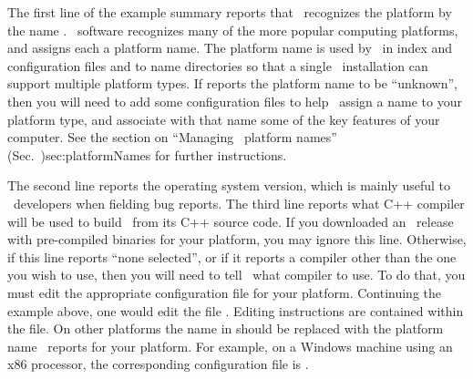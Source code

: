 The first line of the example summary reports that \OOMMF\ recognizes
the platform by the name .  \OOMMF\ software recognizes many
of the more popular computing platforms, and assigns each a platform
name.  The platform name is used by \OOMMF\ in index and configuration
files and to name directories so that a single \OOMMF\ installation can
support multiple platform types.  If  reports
the platform name to be ``unknown'', then you will need to add some
configuration files to help \OOMMF\ assign a name to your platform type,
and associate with that name some of the key features of your computer.
See the section on
{``Managing \OOMMF\ platform names'' (Sec.~}{)}{sec:platformNames}
for further instructions.

The second line reports the operating system version, which is mainly
useful to \OOMMF\ developers when fielding bug reports.
The third line reports what C++ compiler will be used to build
\OOMMF\ from its C++ source code.  If you downloaded an \OOMMF\
release with pre-compiled binaries for your platform, you may
ignore this line.  Otherwise, if this line reports ``none selected'',
or if it reports a compiler other than the one you wish to use,
then you will need to tell \OOMMF\ what compiler to use.  To do
that, you must edit the appropriate configuration file for your
platform.  Continuing the example above, one would edit the file 
\fn{config/platforms/lintel.tcl}.  Editing instructions are contained within
the file.  On other platforms the name \fn{lintel}
in  should be replaced with the
platform name \OOMMF\ reports for your platform.  For example,
on a Windows machine using an x86 processor,
the corresponding configuration file is .

